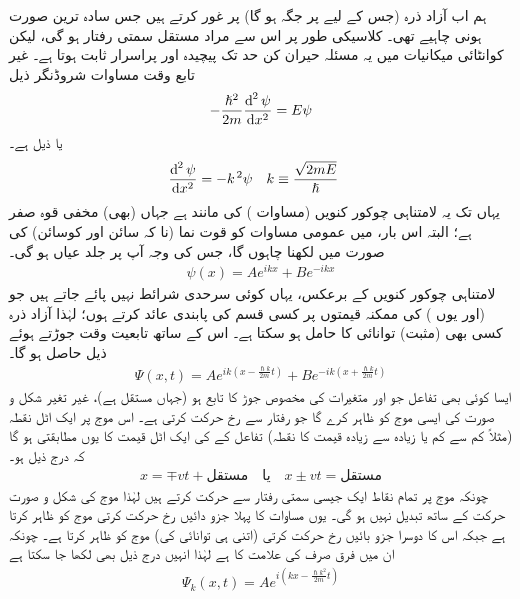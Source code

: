 ہم اب آزاد ذرہ (جس کے لیے پر جگہ  ہو گا) پر غور کرتے ہیں جس سادہ ترین صورت ہونی چاہیے تھی۔ کلاسیکی طور پر اس سے مراد مستقل سمتی رفتار ہو گی، لیکن کوانٹائی میکانیات میں یہ مسئلہ حیران کن حد تک پیچیدہ اور پراسرار ثابت ہوتا ہے۔ غیر تابع وقت مساوات شروڈنگر ذیل 
\begin{align}\label{مساوات_شروڈنگر_آزاد_ذرہ_الف}
-\frac{\hslash^{2}}{2m}\frac{\dif^{\,2}{\psi}}{\dif{x^{2}}}=E\psi
\end{align}
یا ذیل ہے۔
\begin{align}
\frac{\dif^{\,2}{\psi}}{\dif{x^{2}}}&=-k^{\,2}\psi&& k\equiv\frac{\sqrt{2mE}}{\hslash}
\end{align}
یہاں تک یہ لامتناہی چوکور کنویں (مساوات ) کی مانند ہے جہاں (بھی) مخفی قوہ صفر ہے؛ البتہ اس بار، میں عمومی مساوات کو قوت نما (نا کہ سائن اور کوسائن) کی صورت میں لكهنا چاہوں گا، جس کی وجہ آپ پر جلد عیاں ہو گی۔
\begin{align}
\psi(x)=Ae^{ikx}+Be^{-ikx}
\end{align}
لامتناہی چوکور کنویں کے برعکس، یہاں کوئی سرحدی شرائط نہیں پائے جاتے ہیں جو  (اور یوں ) کی ممکنہ قیمتوں پر کسی قسم کی پابندی عائد کرتے ہوں؛ لہٰذا آزاد ذرہ کسی بھی (مثبت) توانائی کا حامل ہو سکتا ہے۔ اس کے ساتھ تابعیت وقت 
جوڑتے ہوئے ذیل حاصل ہو گا۔
\begin{align}\label{مساوات_شروڈنگر_آزاد_ذرہ_حرکت}
\Psi(x,t)=Ae^{ik(x-\frac{\hslash k}{2m}t)}+Be^{-ik(x+\frac{\hslash k}{2m}t)}
\end{align}
ایسا کوئی بھی تفاعل جو  اور  متغیرات کی مخصوص جوڑ  کا تابع ہو (جہاں  مستقل ہے)، 
 غیر تغیر شکل و صورت کی ایسی موج کو ظاہر کرے گا جو  رفتار سے  رخ حرکت کرتی ہے۔ اس موج پر ایک اٹل نقطہ (مثلاً کم سے کم یا زیادہ سے زیادہ قیمت کا نقطہ) تفاعل کے  کی ایک اٹل قیمت کا یوں مطابقتی ہو گا کہ درج ذیل ہو۔
\begin{align*}
x=\mp vt+\text{مستقل}\quad \text{یا}\quad x\pm vt=\text{مستقل}
\end{align*}
چونکہ موج پر تمام نقاط ایک جیسی سمتی رفتار سے حرکت کرتے ہیں لہٰذا موج کی شکل و صورت حرکت کے ساتھ تبدیل نہیں ہو گی۔ یوں مساوات  کا پہلا جزو دائیں رخ حرکت کرتی موج کو ظاہر کرتا ہے جبکہ اس کا دوسرا جزو بائیں رخ حرکت کرتی (اتنی ہی توانائی کی) موج کو ظاہر کرتا ہے۔ چونکہ ان میں فرق صرف  کی علامت کا ہے لہٰذا انہیں درج ذیل بھی لکھا جا سکتا ہے 
\begin{align}\label{مساوات_غیر_تابع_دائیں_رخ_چلتی}
\Psi_{k}(x,t)=Ae^{i(kx-\frac{\hslash k^{2}}{2m}t)}
\end{align}
